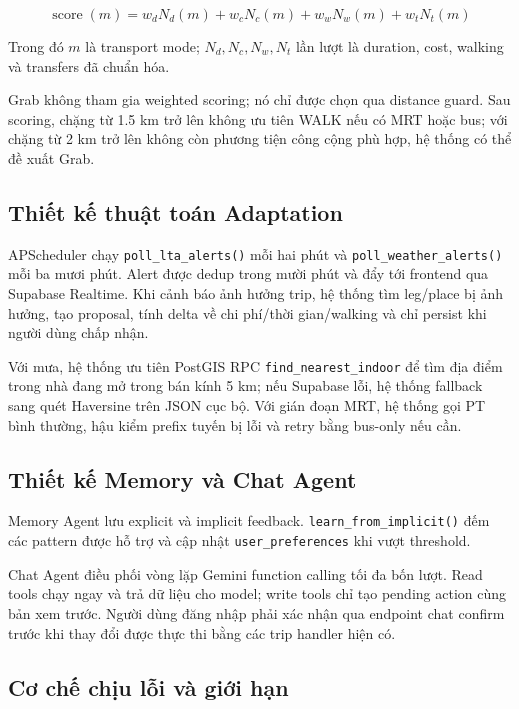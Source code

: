 \documentclass[12pt,a4paper]{article}
\begin{document}
\[
\operatorname{score}(m) =
w_d N_d(m) +
w_c N_c(m) +
w_w N_w(m) +
w_t N_t(m)
\]

Trong đó \(m\) là transport mode; \(N_d,N_c,N_w,N_t\) lần lượt là duration, cost, walking và transfers đã chuẩn hóa.

Grab không tham gia weighted scoring; nó chỉ được chọn qua distance guard. Sau scoring, chặng từ 1.5 km trở lên không ưu tiên WALK nếu có MRT hoặc bus; với chặng từ 2 km trở lên không còn phương tiện công cộng phù hợp, hệ thống có thể đề xuất Grab.

\subsection{Thiết kế thuật toán Adaptation}


APScheduler chạy \texttt{poll\_lta\_alerts()} mỗi hai phút và \texttt{poll\_weather\_alerts()} mỗi ba mươi phút. Alert được dedup trong mười phút và đẩy tới frontend qua Supabase Realtime. Khi cảnh báo ảnh hưởng trip, hệ thống tìm leg/place bị ảnh hưởng, tạo proposal, tính delta về chi phí/thời gian/walking và chỉ persist khi người dùng chấp nhận.

Với mưa, hệ thống ưu tiên PostGIS RPC \texttt{find\_nearest\_indoor} để tìm địa điểm trong nhà đang mở trong bán kính 5 km; nếu Supabase lỗi, hệ thống fallback sang quét Haversine trên JSON cục bộ. Với gián đoạn MRT, hệ thống gọi PT bình thường, hậu kiểm prefix tuyến bị lỗi và retry bằng bus-only nếu cần.

\subsection{Thiết kế Memory và Chat Agent}

Memory Agent lưu explicit và implicit feedback. \texttt{learn\_from\_implicit()} đếm các pattern được hỗ trợ và cập nhật \texttt{user\_preferences} khi vượt threshold.

Chat Agent điều phối vòng lặp Gemini function calling tối đa bốn lượt. Read tools chạy ngay và trả dữ liệu cho model; write tools chỉ tạo pending action cùng bản xem trước. Người dùng đăng nhập phải xác nhận qua endpoint chat confirm trước khi thay đổi được thực thi bằng các trip handler hiện có.

\subsection{Cơ chế chịu lỗi và giới hạn}
\end{document}

